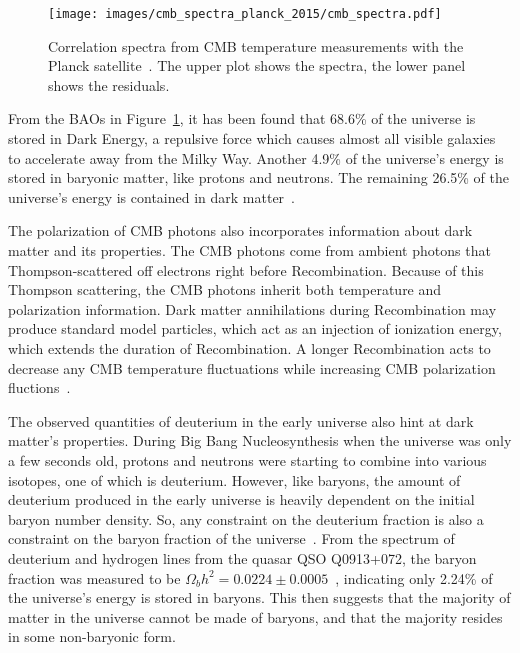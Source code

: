    \begin{figure}[ht]
      \centering
      \texttt{[image: images/cmb\_spectra\_planck\_2015/cmb\_spectra.pdf]}
      \caption[Cosmic Micrwave Background Correlation Spectrum]{
        Correlation spectra from CMB temperature measurements with the Planck satellite~\cite{planck2015_cmb_spectra}.
        The upper plot shows the spectra, the lower panel shows the residuals.
      }
      \label{fig:cmb_correlation_spectra}
    \end{figure}
    
    From the BAOs in Figure~\ref{fig:cmb_correlation_spectra}, it has been found that 68.6\% of the universe is stored in Dark Energy, a repulsive force which causes almost all visible galaxies to accelerate away from the Milky Way.
    Another 4.9\% of the universe's energy is stored in baryonic matter, like protons and neutrons.
    The remaining 26.5\% of the universe's energy is contained in dark matter~\cite{planck2015}.
    
    The polarization of CMB photons also incorporates information about dark matter and its properties.
    The CMB photons come from ambient photons that Thompson-scattered off electrons right before Recombination.
    Because of this Thompson scattering, the CMB photons inherit both temperature and polarization information.
    Dark matter annihilations during Recombination may produce standard model particles, which act as an injection of ionization energy, which extends the duration of Recombination.
    A longer Recombination acts to decrease any CMB temperature fluctuations while increasing CMB polarization fluctions~\cite{cmb_polarization1,cmb_polarization2}.
    
    The observed quantities of deuterium in the early universe also hint at dark matter's properties.
    During Big Bang Nucleosynthesis when the universe was only a few seconds old, protons and neutrons were starting to combine into various isotopes, one of which is deuterium.
    However, like baryons, the amount of deuterium produced in the early universe is heavily dependent on the initial baryon number density.
    So, any constraint on the deuterium fraction is also a constraint on the baryon fraction of the universe~\cite{deuterium1,deuterium2}.
    From the spectrum of deuterium and hydrogen lines from the quasar QSO Q0913+072, the baryon fraction was measured to be $\Omega_{b}h^2 = 0.0224 \pm 0.0005$~\cite{deuterium3}, indicating only 2.24\% of the universe's energy is stored in baryons.
    This then suggests that the majority of matter in the universe cannot be made of baryons, and that the majority resides in some non-baryonic form.
    
